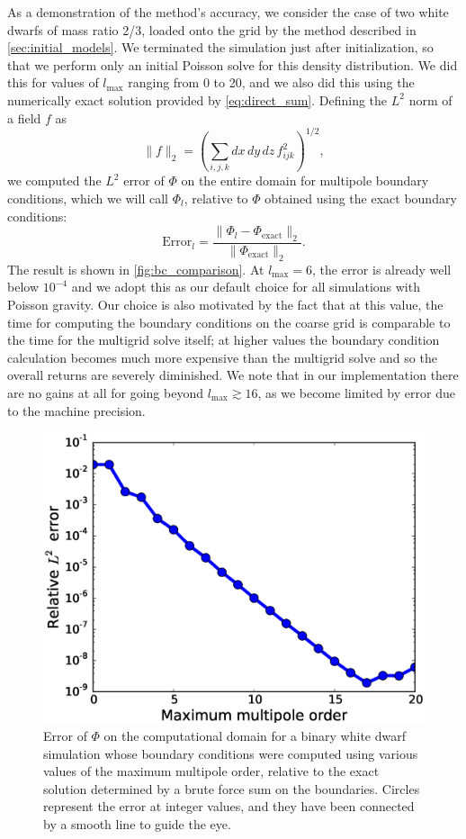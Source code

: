 \documentclass[iop]{../emulateapj}
\begin{document}
As a demonstration of the method's accuracy, we consider the case of two 
white dwarfs of mass ratio 2/3, loaded onto the grid by the method described 
in \autoref{sec:initial_models}. We terminated the simulation just after
initialization, so that we perform only an initial Poisson solve for this 
density distribution. We did this for values of $l_{\text{max}}$ ranging
from 0 to 20, and we also did this using the numerically exact solution 
provided by \autoref{eq:direct_sum}.  Defining the $L^2$
norm of a field $f$ as
\begin{equation}
  \| f \|_2 = \left(\sum_{i,j,k} dx\, dy\, dz\, f_{ijk}^2\right)^{1/2},
\end{equation}
we computed the $L^2$ error of $\Phi$ on the entire domain for multipole 
boundary conditions, which we will call $\Phi_l$, relative to $\Phi$ 
obtained using the exact boundary conditions:
\begin{equation}
  \text{Error}_l = \frac{\|\Phi_l - \Phi_{\text{exact}}\|_2}{\|\Phi_{\text{exact}}\|_2}.
\end{equation}
The result is shown in \autoref{fig:bc_comparison}. At $l_{\text{max}} = 6$,
the error is already well below $10^{-4}$ and we adopt this as our default 
choice for all simulations with Poisson gravity. Our choice is also motivated by the 
fact that at this value, the time for computing the boundary conditions on the
coarse grid is comparable to the time for the multigrid solve itself; at higher values 
the boundary condition calculation becomes much more expensive than the multigrid solve
and so the overall returns are severely diminished. We note that in our implementation 
there are no gains at all for going beyond $l_{\text{max}} \gtrsim 16$, as we 
become limited by error due to the machine precision.
\begin{figure}[h]
  \centering
  \includegraphics[scale=0.45]{plots/bc_comparison}
  \caption{Error of $\Phi$ on the computational domain for a binary white dwarf simulation 
    whose boundary conditions were computed using various values of the maximum multipole order,
    relative to the exact solution determined by a brute force sum on the boundaries.
    Circles represent the error at integer values, and they have been connected by a smooth 
    line to guide the eye.\label{fig:bc_comparison}}
\end{figure}
\end{document}

